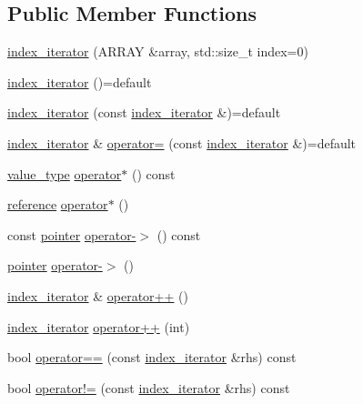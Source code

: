 \subsection*{Public Member Functions}
\begin{DoxyCompactItemize}
\item 
\hyperlink{structmui_1_1index__iterator_a974125f59982128660e17777a3b6cea8}{index\+\_\+iterator} (A\+R\+R\+AY \&array, std\+::size\+\_\+t index=0)
\item 
\hyperlink{structmui_1_1index__iterator_aef7a1a21afb42127dff73b2ebcb5c0a7}{index\+\_\+iterator} ()=default
\item 
\hyperlink{structmui_1_1index__iterator_ac51630f186471fbc8c55320e58b34439}{index\+\_\+iterator} (const \hyperlink{structmui_1_1index__iterator}{index\+\_\+iterator} \&)=default
\item 
\hyperlink{structmui_1_1index__iterator}{index\+\_\+iterator} \& \hyperlink{structmui_1_1index__iterator_aa86f191c1d319200d0aad177bf11d49a}{operator=} (const \hyperlink{structmui_1_1index__iterator}{index\+\_\+iterator} \&)=default
\item 
\hyperlink{structmui_1_1index__iterator_a795af944e7eb34f4842a7f5d138fe186}{value\+\_\+type} \hyperlink{structmui_1_1index__iterator_a8a9a41e163764c4e4a72a8e06f4835be}{operator$\ast$} () const
\item 
\hyperlink{structmui_1_1index__iterator_a3854dd112d5ca1a649babb0357e02394}{reference} \hyperlink{structmui_1_1index__iterator_a967bee24f2b395b2a25dc76f9d22aacb}{operator$\ast$} ()
\item 
const \hyperlink{structmui_1_1index__iterator_afbdc05d0a9403f2fb4002373c06dce97}{pointer} \hyperlink{structmui_1_1index__iterator_abe41aeb655f2be324323b8b445652abc}{operator-\/$>$} () const
\item 
\hyperlink{structmui_1_1index__iterator_afbdc05d0a9403f2fb4002373c06dce97}{pointer} \hyperlink{structmui_1_1index__iterator_ac34c72a3ac62e28434a5cd1f4e4d0427}{operator-\/$>$} ()
\item 
\hyperlink{structmui_1_1index__iterator}{index\+\_\+iterator} \& \hyperlink{structmui_1_1index__iterator_aaf0cc8e107e38388a15cf807b8f682fa}{operator++} ()
\item 
\hyperlink{structmui_1_1index__iterator}{index\+\_\+iterator} \hyperlink{structmui_1_1index__iterator_a7d8d2fecca6cf02b42a6de076cc766ea}{operator++} (int)
\item 
bool \hyperlink{structmui_1_1index__iterator_a9ed7f58e028b71b7b62a9174dc65e3b8}{operator==} (const \hyperlink{structmui_1_1index__iterator}{index\+\_\+iterator} \&rhs) const
\item 
bool \hyperlink{structmui_1_1index__iterator_a4d779fea0337c8d40e368c93e2c137a6}{operator!=} (const \hyperlink{structmui_1_1index__iterator}{index\+\_\+iterator} \&rhs) const
\end{DoxyCompactItemize}



